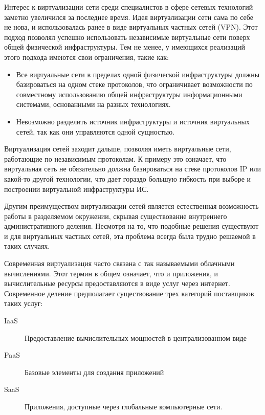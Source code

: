 Интерес к виртуализации сети среди специалистов в сфере сетевых технологий заметно
увеличился за последнее время. Идея виртуализации сети сама по себе не нова, и использовалась
ранее в виде виртуальных частных сетей (VPN). Этот подход позволял успешно использовать
независимые виртуальные сети поверх общей физической инфраструктуры. Тем не менее,
у имеющихся реализаций этого подхода имеются свои ограничения, такие как:
\begin{itemize}
    \item Все виртуальные сети в пределах одной физической инфраструктуры должны базироваться
    на одном стеке протоколов, что ограничивает возможности по совместному использованию
    общей инфраструктуры информационными системами, основанными на разных технологиях.
     \item Невозможно разделить источник инфраструктуры и источник виртуальных сетей,
     так как они управляются одной сущностью.
\end{itemize}
Виртуализация сетей заходит дальше, позволяя иметь виртуальные сети, работающие по
независимым протоколам. К примеру это означает, что виртуальная сеть не обязательно
должна базироваться на стеке протоколов IP или какой-то другой технологии, что 
дает гораздо большую гибкость при выборе и построении виртуальной инфраструктуры ИС.

Другим преимуществом виртуализации сетей является естественная возможность работы
в разделяемом окружении, скрывая существование внутреннего административного деления.
Несмотря на то, что подобные решения существуют и для виртуальных частных сетей,
эта проблема всегда была трудно решаемой в таких случаях.
\cite{Carapinha:2009:NVV:1592648.1592660}

Современная виртуализация часто связана с так называемыми облачными вычислениями.
Этот термин в общем означает, что и приложения, и вычислительные ресурсы предоставляются в виде услуг через интернет.\cite{Armbrust:2010:VCC:1721654.1721672} Современное деление предполагает существование трех категорий
поставщиков таких услуг:\cite{Creeger:2009:CCO:1551644.1554608}
\begin{description}
    \item[IaaS] Предоставление вычислительных мощностей в централизованном виде
    \item[PaaS] Базовые элементы для создания приложений
    \item[SaaS] Приложения, доступные через глобальные компьютерные сети.
\end{description}

